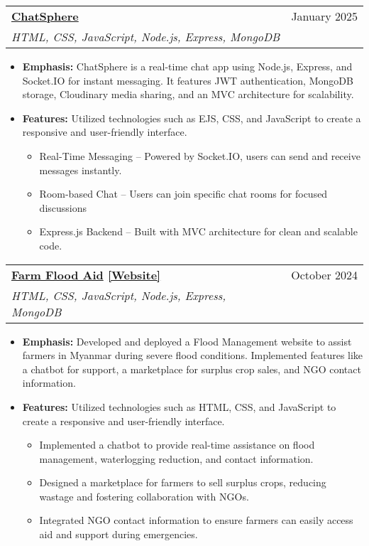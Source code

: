 \documentclass[apaper,20pt]{article}
\makeatletter
\newcommand{\MYhref}[3][primaryColor]{\href{#2}{{\color{#1}#3}}}
\newcommand{\resumeSubheading}[4]{
  \vspace{-1pt}\item
    \begin{tabular*}{0.97\textwidth}{l@{\extracolsep{\fill}}r}
      \textbf{#1} & #2 \\
      \textit{#3} & \textit{#4} \\
    \end{tabular*}\vspace{-5pt}
}
\newcommand{\resumeItemListStart}{\begin{itemize}}
\newcommand{\resumeItemListEnd}{\end{itemize}\vspace{-5pt}}
\makeatother
\begin{document}
\resumeSubheading
  {\MYhref{https://github.com/itsnikhil24/New_Chatapp.git}{ChatSphere}} 
  {January 2025} 
  {HTML, CSS, JavaScript, Node.js, Express, MongoDB} 
  {}


\resumeItemListStart
    \item \textbf{Emphasis:} ChatSphere is a real-time chat app using Node.js, Express, and Socket.IO for instant messaging. It features JWT authentication, MongoDB storage, Cloudinary media sharing, and an MVC architecture for scalability.
    \item \textbf{Features:} Utilized technologies such as EJS, CSS, and JavaScript to create a responsive and user-friendly interface.
    \begin{itemize}
        \item Real-Time Messaging – Powered by Socket.IO, users can send and receive messages instantly.
        \item Room-based Chat – Users can join specific chat rooms for focused discussions
        \item Express.js Backend – Built with MVC architecture for clean and scalable code.
    \end{itemize}
\resumeItemListEnd

\resumeSubheading{\MYhref{https://github.com/itsnikhil24/Floodmanagement.git}{Farm Flood Aid} \MYhref[red]{https://flood-management-website.vercel.app/}{[Website]}}{October 2024}{HTML, CSS, JavaScript, Node.js, Express, MongoDB}{}

\resumeItemListStart
    \item \textbf{Emphasis:} Developed and deployed a Flood Management website to assist farmers in Myanmar during severe flood conditions. Implemented features like a chatbot for support, a marketplace for surplus crop sales, and NGO contact information.
    \item \textbf{Features:} Utilized technologies such as HTML, CSS, and JavaScript to create a responsive and user-friendly interface.
    \begin{itemize}
        \item Implemented a chatbot to provide real-time assistance on flood management, waterlogging reduction, and contact information.
        \item Designed a marketplace for farmers to sell surplus crops, reducing wastage and fostering collaboration with NGOs.
        \item Integrated NGO contact information to ensure farmers can easily access aid and support during emergencies.
    \end{itemize}
\resumeItemListEnd
\end{document}
